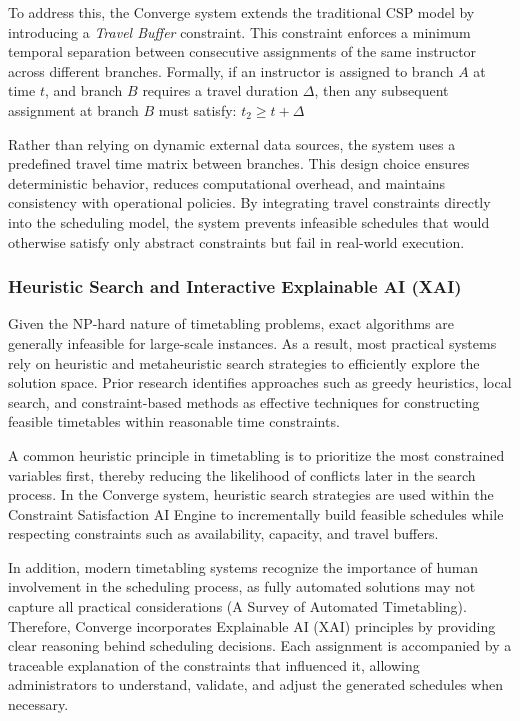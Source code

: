 To address this, the Converge system extends the traditional CSP model by introducing a \textit{Travel Buffer} constraint. This constraint enforces a minimum temporal separation between consecutive assignments of the same instructor across different branches. Formally, if an instructor is assigned to branch $A$ at time $t$, and branch $B$ requires a travel duration $\Delta$, then any subsequent assignment at branch $B$ must satisfy: $t_2 \geq t + \Delta$

Rather than relying on dynamic external data sources, the system uses a predefined travel time matrix between branches. This design choice ensures deterministic behavior, reduces computational overhead, and maintains consistency with operational policies. By integrating travel constraints directly into the scheduling model, the system prevents infeasible schedules that would otherwise satisfy only abstract constraints but fail in real-world execution.

\subsubsection{Heuristic Search and Interactive Explainable AI (XAI)}
Given the NP-hard nature of timetabling problems, exact algorithms are generally infeasible for large-scale instances. As a result, most practical systems rely on heuristic and metaheuristic search strategies to efficiently explore the solution space. Prior research identifies approaches such as greedy heuristics, local search, and constraint-based methods as effective techniques for constructing feasible timetables within reasonable time constraints\cite{schaerf1999}.

A common heuristic principle in timetabling is to prioritize the most constrained variables first, thereby reducing the likelihood of conflicts later in the search process. In the Converge system, heuristic search strategies are used within the Constraint Satisfaction AI Engine to incrementally build feasible schedules while respecting constraints such as availability, capacity, and travel buffers.

In addition, modern timetabling systems recognize the importance of human involvement in the scheduling process, as fully automated solutions may not capture all practical considerations (A Survey of Automated Timetabling). Therefore, Converge incorporates Explainable AI (XAI) principles by providing clear reasoning behind scheduling decisions. Each assignment is accompanied by a traceable explanation of the constraints that influenced it, allowing administrators to understand, validate, and adjust the generated schedules when necessary.

